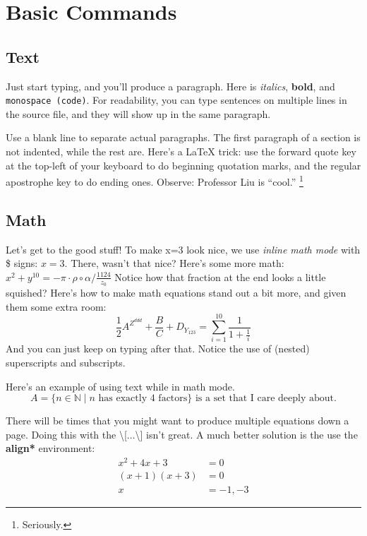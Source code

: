 \documentclass[12pt]{article}
\begin{document}
\section{Basic Commands}
\subsection{Text}
Just start typing, and you'll produce a paragraph.
Here is \emph{italics}, \textbf{bold}, and \texttt{monospace (code)}.
For readability, you can type sentences on multiple lines in the source file, and they will show up in the same paragraph.

Use a blank line to separate actual paragraphs. The first paragraph of a section is not indented, while the rest are.
Here's a {\LaTeX} trick: use the forward quote key at the top-left of your keyboard to do beginning quotation marks, and the regular apostrophe key to do ending ones.
Observe: Professor Liu is ``cool.''
\footnote{Seriously.}

\subsection{Math}
Let's get to the good stuff! To make x=3 look nice, we use \emph{inline math mode} with \$ signs: $x = 3$.
There, wasn't that nice?
Here's some more math:
$x^2 + y^{10} = -\pi \cdot \rho \circ \alpha / \frac{1124}{z_0}$
Notice how that fraction at the end looks a little squished?
Here's how to make math equations stand out a bit more, and given them some extra room:
\[ \frac{1}{2} A^{Z^{ddd}} + \frac{B}{C} + D_{Y_{123}} = \sum_{i=1}^{10} \frac{1}{1 + \frac{1}{i}} \]
And you can just keep on typing after that.
Notice the use of (nested) superscripts and subscripts.

Here's an example of using text while in math mode.
\[ A = \{n \in \mathbb{N} \mid n \text{ has exactly 4 factors}\} \text{ is a set that I care deeply about.}\]

There will be times that you might want to produce multiple equations down a page.
Doing this with the \textbackslash [$\ldots$\textbackslash ] isn't great.
A much better solution is the use the \textbf{align*} environment:
\begin{align*}
x^2 + 4x + 3 &= 0 \\     %
(x + 1)(x + 3) &= 0 \\
x &= -1, -3 \tag{Eq. 1}  %
\end{align*}
\end{document}
